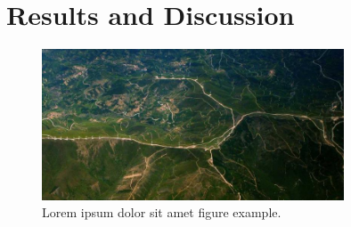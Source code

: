 \section{Results and Discussion}

\lipsum[1-2]



\lipsum[3-5]

\begin{figure}[ht]
    \centering
    \includegraphics[width=0.8\textwidth]{images/result-figure-1.jpg}
    \caption{Lorem ipsum dolor sit amet figure example.}
    \label{fig:example}
\end{figure}

\lipsum[6-8]

\lipsum[9-12]
